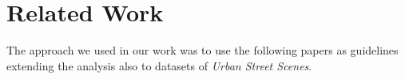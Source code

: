 \documentclass[10pt,twocolumn,letterpaper]{article}
\begin{document}

\section{Related Work}
\label{sec:related-work}
The approach we used in our work was to use the following papers as guidelines~\cite{Authors1_maskrcnn, Authors2_BlendMask, Authors6_SOLOv2, Authors7_deepsnake} extending the analysis also to datasets of \textit{Urban Street Scenes}.
\end{document}
